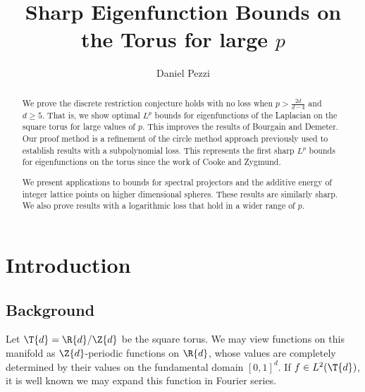 \documentclass[11pt]{amsart}
\begin{document}
\title{Sharp Eigenfunction Bounds on the Torus for large $p$}
\author{Daniel Pezzi}
\date{}

\begin{abstract}
We prove the discrete restriction conjecture holds with no loss when $p>\frac{2d}{d-4}$ and $d\geq 5$. That is, we show optimal $L^p$ bounds for eigenfunctions of the Laplacian on the square torus for large values of $p$. This improves the results of Bourgain and Demeter. Our proof method is a refinement of the circle method approach previously used to establish results with a subpolynomial loss. This represents the first sharp $L^p$ bounds for eigenfunctions on the torus since the work of Cooke and Zygmund.

We present applications to bounds for spectral projectors and the additive energy of integer lattice points on higher dimensional spheres. These results are similarly sharp. We also prove results with a logarithmic loss that hold in a wider range of $p$.
\end{abstract}
\maketitle

\maketitle

\newcommand{\Addresses}{{%
  \bigskip
  \footnotesize
  Daniel~Pezzi; \textsc{Department of Mathematics, Krieger Hall, Homewood Campus, Johns Hopkins University, 3400 N. Charles Street Baltimore, MD 21218, United States}\par\nopagebreak
  \textit{E-mail address}, \texttt{dpezzi1@jh.edu}

}}

\section{Introduction}\label{Section1}
\subsection{Background}
Let $\T{d} = \R{d}/\Z{d}$ be the square torus. We may view functions on this manifold as $\Z{d}$-periodic functions on $\R{d}$, whose values are completely determined by their values on the fundamental domain $[0,1]^d$. If $f\in L^2(\T{d})$, it is well known we may expand this function in Fourier series.
\end{document}

